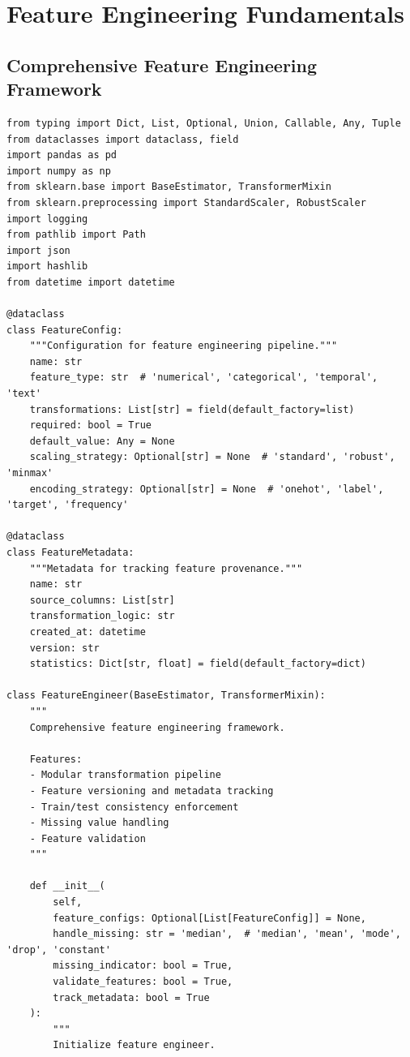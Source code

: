 \section{Feature Engineering Fundamentals}

\subsection{Comprehensive Feature Engineering Framework}

\begin{lstlisting}[style=python, caption={Production Feature Engineering Framework}]
from typing import Dict, List, Optional, Union, Callable, Any, Tuple
from dataclasses import dataclass, field
import pandas as pd
import numpy as np
from sklearn.base import BaseEstimator, TransformerMixin
from sklearn.preprocessing import StandardScaler, RobustScaler
import logging
from pathlib import Path
import json
import hashlib
from datetime import datetime

@dataclass
class FeatureConfig:
    """Configuration for feature engineering pipeline."""
    name: str
    feature_type: str  # 'numerical', 'categorical', 'temporal', 'text'
    transformations: List[str] = field(default_factory=list)
    required: bool = True
    default_value: Any = None
    scaling_strategy: Optional[str] = None  # 'standard', 'robust', 'minmax'
    encoding_strategy: Optional[str] = None  # 'onehot', 'label', 'target', 'frequency'

@dataclass
class FeatureMetadata:
    """Metadata for tracking feature provenance."""
    name: str
    source_columns: List[str]
    transformation_logic: str
    created_at: datetime
    version: str
    statistics: Dict[str, float] = field(default_factory=dict)

class FeatureEngineer(BaseEstimator, TransformerMixin):
    """
    Comprehensive feature engineering framework.

    Features:
    - Modular transformation pipeline
    - Feature versioning and metadata tracking
    - Train/test consistency enforcement
    - Missing value handling
    - Feature validation
    """

    def __init__(
        self,
        feature_configs: Optional[List[FeatureConfig]] = None,
        handle_missing: str = 'median',  # 'median', 'mean', 'mode', 'drop', 'constant'
        missing_indicator: bool = True,
        validate_features: bool = True,
        track_metadata: bool = True
    ):
        """
        Initialize feature engineer.


\end{lstlisting}
